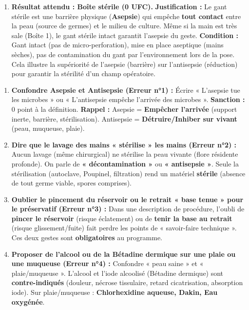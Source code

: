 \documentclass[11pt]{article}
\begin{document}
\begin{exoresolu}
\begin{enumerate}
        \item \textbf{Résultat attendu : Boîte stérile (0 UFC).} \textbf{Justification :} Le gant stérile est une barrière physique (\textbf{Asepsie}) qui empêche \textbf{tout contact} entre la peau (source de germes) et le milieu de culture. Même si la main est très sale (Boîte 1), le gant stérile intact garantit l'asepsie du geste. \textbf{Condition :} Gant intact (pas de micro-perforation), mise en place aseptique (mains sèches), pas de contamination du gant par l'environnement lors de la pose. Cela illustre la supériorité de l'asepsie (barrière) sur l'antisepsie (réduction) pour garantir la stérilité d'un champ opératoire.
    \end{enumerate}
\end{exoresolu}

\begin{attention}
    \begin{enumerate}
        \item \textbf{Confondre Asepsie et Antisepsie (Erreur n°1) :} Écrire « L'asepsie tue les microbes » ou « L'antisepsie empêche l'arrivée des microbes ». \textbf{Sanction :} 0 point à la définition. \textbf{Rappel :} Asepsie = \textbf{Empêcher l'arrivée} (support inerte, barrière, stérilisation). Antisepsie = \textbf{Détruire/Inhiber sur vivant} (peau, muqueuse, plaie).
        \item \textbf{Dire que le lavage des mains « stérilise » les mains (Erreur n°2) :} Aucun lavage (même chirurgical) ne stérilise la peau vivante (flore résidente profonde). On parle de \textbf{« décontamination »} ou \textbf{« antisepsie »}. Seule la stérilisation (autoclave, Poupinel, filtration) rend un matériel \textbf{stérile} (absence de tout germe viable, spores comprises).
        \item \textbf{Oublier le pincement du réservoir ou le retrait « base tenue » pour le préservatif (Erreur n°3) :} Dans une description de procédure, l'oubli de \textbf{pincer le réservoir} (risque éclatement) ou de \textbf{tenir la base au retrait} (risque glissement/fuite) fait perdre les points de « savoir-faire technique ». Ces deux gestes sont \textbf{obligatoires} au programme.
        \item \textbf{Proposer de l'alcool ou de la Bétadine dermique sur une plaie ou une muqueuse (Erreur n°4) :} Confondre « peau saine » et « plaie/muqueuse ». L'alcool et l'iode alcoolisé (Bétadine dermique) sont \textbf{contre-indiqués} (douleur, nécrose tissulaire, retard cicatrisation, absorption iode). Sur plaie/muqueuse : \textbf{Chlorhexidine aqueuse, Dakin, Eau oxygénée}.

\end{enumerate}
\end{attention}
\end{document}
